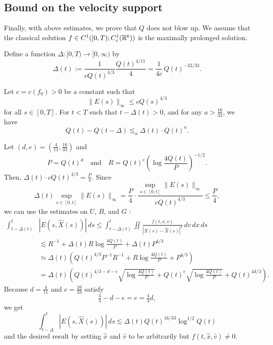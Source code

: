 \documentclass{article}
\begin{document}
\subsection{Bound on the velocity support}
Finally, with above estimates, we prove that $Q$ does not blow up.
We assume that the classical solution $f\in C^1([0,T);C_c^1(\mathbb{R}^6))$ is the maximally prolonged solution.
\begin{defn}
Define a function $\Delta:[0,T)\to[0,\infty)$ by
\[\Delta(t):=\frac1{cQ(t)^{4/3}}\frac{Q(t)^{4/11}}4=\frac1{4c}\,Q(t)^{-32/33}.\]
\end{defn}
\begin{cor}
Let $c=c(f_0)>0$ be a constant such that
\[\|E(s)\|_\infty\le cQ(s)^{4/3}\]
for all $s\in[0,T]$.
For $t<T$ such that $t-\Delta(t)>0$, and for any $a>\frac{16}{33}$, we have
\[Q(t)-Q(t-\Delta)\lesssim_a\Delta(t)\cdot Q(t)^a.\]
\end{cor}
\begin{pf}
Let $(d,e)=(\frac4{11},\frac{16}{33})$ and
\[P=Q(t)^d\quad\text{and}\quad R=Q(t)^e(\log\frac{4Q(t)}P)^{-1/2}.\]
Then, $\Delta(t)\cdot cQ(t)^{4/3}=\frac P4$.
Since
\[\Delta(t)\sup_{s\in[0,t]}\|E(s)\|_\infty=\frac P4\cdot\frac{\sup_{s\in[0,t]}\|E(s)\|_\infty}{cQ(t)^{4/3}}\le\frac P4,\]
we can use the estimates on $U$, $B$, and $G$ :
\begin{align*}
\int_{t-\Delta(t)}^t&|E(s,\hat X(s))|\,ds
\le\int_{t-\Delta(t)}^t\iint\frac{f(t,x,v)}{|X(s)-\hat X(s)|^2}\,dv\,dx\,ds\\
&\lesssim R^{-1}+\Delta(t)R\log\frac{4Q(t)}P+\Delta(t)P^{4/3}\\
&\simeq\Delta(t)\left(Q(t)^{4/3}P^{-1}R^{-1}+R\log\frac{4Q(t)}P+P^{4/3}\right)\\
&=\Delta(t)\left(Q(t)^{4/3-d-e}\sqrt{\log\frac{4Q(t)}P}+Q(t)^e\sqrt{\log\frac{4Q(t)}P}+Q(t)^{4d/3}\right).
\end{align*}
Because $d=\frac4{11}$ and $e=\frac{16}{33}$ satisfy
\[\tfrac43-d-e=e=\tfrac43d,\]
we get
\[\int_{t-\Delta}^t|E(s,\hat X(s))|\,ds\lesssim\Delta(t)Q(t)^{16/33}\log^{1/2}Q(t)\]
and the desired result by setting $\hat x$ and $\hat v$ to be arbitrarily but $f(t,\hat x,\hat v)\ne0$.
\end{pf}
\end{document}
